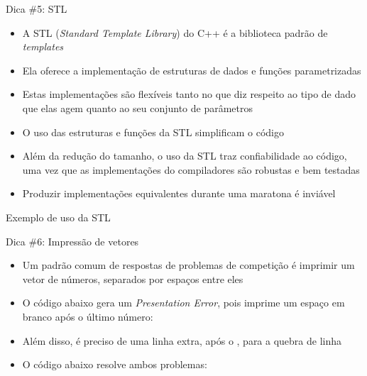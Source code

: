 \begin{frame}[fragile]{Dica \#5: STL}

    \begin{itemize}
        \item A STL (\textit{Standard Template Library}) do C++ é a biblioteca padrão de
            \textit{templates}

        \item Ela oferece a implementação de estruturas de dados e funções parametrizadas

        \item Estas implementações são flexíveis tanto no que diz respeito ao tipo de dado
            que elas agem quanto ao seu conjunto de parâmetros

        \item O uso das estruturas e funções da STL simplificam o código

        \item Além da redução do tamanho, o uso da STL traz confiabilidade ao código, uma
            vez que as implementações do compiladores são robustas e bem testadas

        \item Produzir implementações equivalentes durante uma maratona é inviável
    \end{itemize}

\end{frame}

\begin{frame}[fragile]{Exemplo de uso da STL}
\end{frame}

\begin{frame}[fragile]{Dica \#6: Impressão de vetores}

    \begin{itemize}
        \item Um padrão comum de respostas de problemas de competição é imprimir um
            vetor de números, separados por espaços entre eles

        \item O código abaixo gera um \textit{Presentation Error}, pois imprime um espaço
            em branco após o último número:

        \item Além disso, é preciso de uma linha extra, após o , para a 
            quebra de linha

        \item O código abaixo resolve ambos problemas:
    \end{itemize}

\end{frame}

